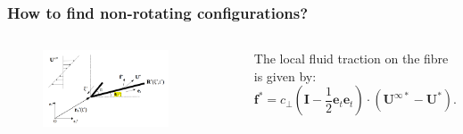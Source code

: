 \documentclass{beamer}
\begin{document}

\begin{frame}
	\frametitle{How to find non-rotating configurations?}
	\begin{overlayarea}{\textwidth}{\textheight}
		\vspace{-0.6cm}
		\begin{columns}
			\begin{figure}[htb]
				\begin{center}
					\includegraphics[width=0.8\textwidth]{plots/schematic/schematic_rigid_configuration_color2.png}
				\end{center}
			\end{figure}\vspace{0.3cm}
			\small 	The local fluid traction on the fibre is given by: 
			\begin{equation*}
				\mathbf{f}^*=c_\perp\left(\mathbf{I}-\frac{1}{2}\mathbf{e}_t\mathbf{e}_t\right)\cdot(\mathbf{U}^{\infty*}-\mathbf{U}^*).
			\end{equation*}
		\end{columns}\vspace{-0.5cm}
		\begin{columns}
			 \vspace{-0.1cm}
		\end{columns}
	\vspace{0.5cm}
	\end{overlayarea}
\end{frame}

\end{document}
